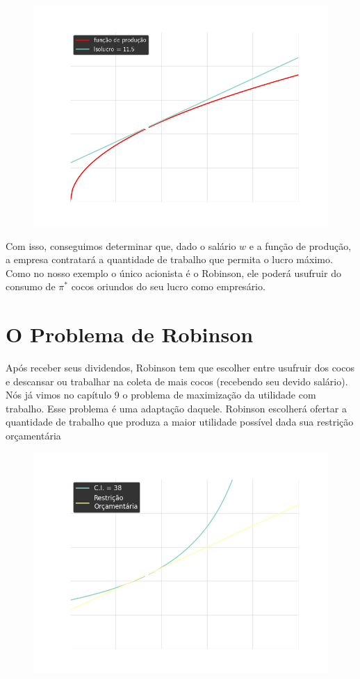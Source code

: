 \documentclass[a4paper,11pt,oneside]{book}
\theoremstyle{definition}
\theoremstyle{break}
\begin{document}
\begin{figure}[H]
	\centering
	\includegraphics[scale=0.6]{cap33_3-max_lucro.png}
\end{figure}

Com isso, conseguimos determinar que, dado o salário $w$ e a função de produção, a empresa contratará a quantidade de trabalho que permita o lucro máximo. Como no nosso exemplo o único acionista é o Robinson, ele poderá usufruir do consumo de $\pi^*$ cocos oriundos do seu lucro como empresário.

\section{O Problema de Robinson}

Após receber seus dividendos, Robinson tem que escolher entre usufruir dos cocos e descansar ou trabalhar na coleta de mais cocos (recebendo seu devido salário). Nós já vimos no capítulo 9 o problema de maximização da utilidade com trabalho. Esse problema é uma adaptação daquele. Robinson escolherá ofertar a quantidade de trabalho que produza a maior utilidade possível dada sua restrição orçamentária

\begin{figure}[H]
	\centering
	\includegraphics[scale=0.6]{cap33_4-max_trabalho.png}
\end{figure}
\end{document}

